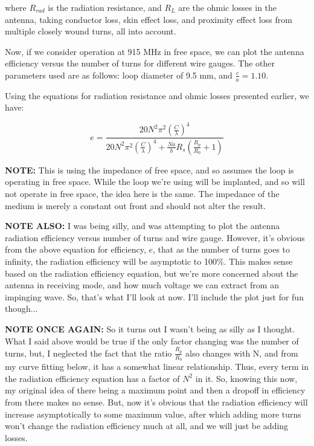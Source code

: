 \documentclass[12pt,onecolumn,titlepage]{article}
\begin{document}
where $R_{rad}$ is the radiation resistance, and $R_L$ are the ohmic losses in the antenna, taking conductor loss, skin effect loss, and proximity effect loss from multiple closely wound turns, all into account. 

Now, if we consider operation at 915 MHz in free space, we can plot the antenna efficiency versus the number of turns for different wire gauges. The other parameters used are as follows: loop diameter of 9.5 mm, and $\frac{c}{a} = 1.10$.

Using the equations for radiation resistance and ohmic losses presented earlier, we have:

\[ e = \frac{ 20 N^2 \pi^2 \left( \frac{C}{\lambda} \right)^4}{20 N^2 \pi^2 \left( \frac{C}{\lambda} \right)^4 + \frac{Na}{b}R_s \left( \frac{R_p}{R_0} + 1 \right) } \]

{\bf{NOTE:}} This is using the impedance of free space, and so assumes the loop is operating in free space. While the loop we're using will be implanted, and so will not operate in free space, the idea here is the same. The impedance of the medium is merely a constant out front and should not alter the result. 

{\bf{NOTE ALSO:}} I was being silly, and was attempting to plot the antenna radiation efficiency versus number of turns and wire gauge. However, it's obvious from the above equation for efficiency, $e$, that as the number of turns goes to infinity, the radiation efficiency will be asymptotic to 100\%. This makes sense based on the radiation efficiency equation, but we're more concerned about the antenna in receiving mode, and how much voltage we can extract from an impinging wave. So, that's what I'll look at now. I'll include the plot just for fun though...

{\bf{NOTE ONCE AGAIN:}} So it turns out I wasn't being as silly as I thought. What I said above would be true if the only factor changing was the number of turns, but, I neglected the fact that the ratio $\frac{R_p}{R_0}$ also changes with N, and from my curve fitting below, it has a somewhat linear relationship. Thus, every term in the radiation efficiency equation has a factor of $N^2$ in it. So, knowing this now, my original idea of there being a maximum point and then a dropoff in efficiency from there makes no sense. But, now it's obvious that the radiation efficiency will increase asymptotically to some maximum value, after which adding more turns won't change the radiation efficiency much at all, and we will just be adding losses.
\end{document}
